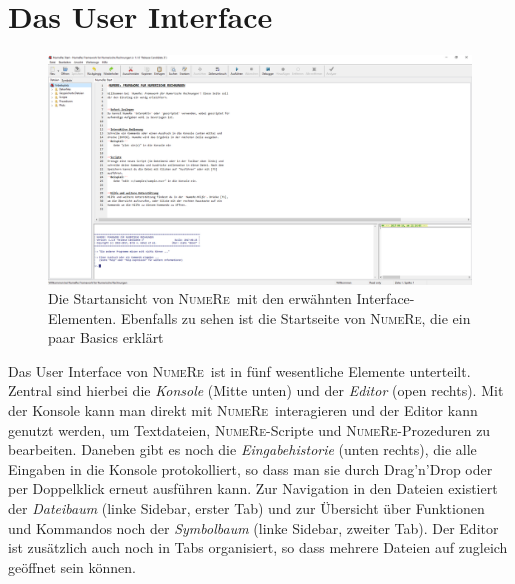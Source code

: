 \documentclass[DIV=14,headsepline,footsepline]{scrbook}
\newcommand{\NR}{\textsc{Nu\-me\-Re}}
\begin{document}
			\section{Das User Interface}
				\begin{figure}[htb]%
					\centering
					\includegraphics[width=\textwidth]{_graphics/ui.png}
					\caption{Die Startansicht von \NR\ mit den erwähnten Interface-Elementen. Ebenfalls zu sehen ist die Startseite von \NR, die ein paar Basics erklärt}
					\label{fig:ui}
				\end{figure}	
				Das User Interface von \NR\ ist in fünf wesentliche Elemente unterteilt. Zentral sind hierbei die \emph{Konsole} (Mitte unten) und der \emph{Editor} (open rechts). Mit der Konsole kann man direkt mit \NR\ interagieren und der Editor kann genutzt werden, um Textdateien, \NR-Scripte und \NR-Prozeduren zu bearbeiten. Daneben gibt es noch die \emph{Eingabehistorie} (unten rechts), die alle Eingaben in die Konsole protokolliert, so dass man sie durch Drag'n'Drop oder per Doppelklick erneut ausführen kann. Zur Navigation in den Dateien existiert der \emph{Dateibaum} (linke Sidebar, erster Tab) und zur Übersicht über Funktionen und Kommandos noch der \emph{Symbolbaum} (linke Sidebar, zweiter Tab). Der Editor ist zusätzlich auch noch in Tabs organisiert, so dass mehrere Dateien auf zugleich geöffnet sein können.
				
\end{document}
